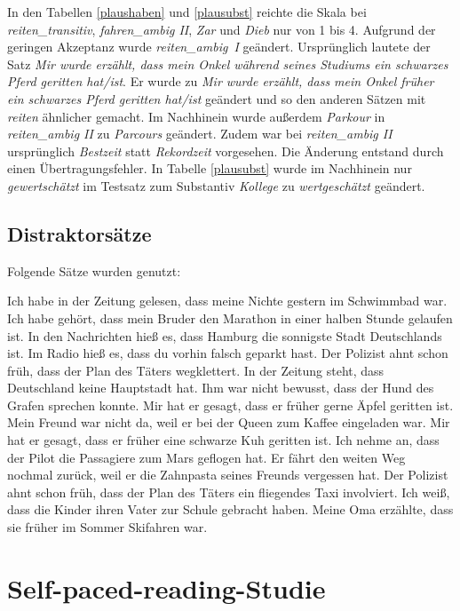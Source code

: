In den Tabellen \ref{plaushaben} und \ref{plausubst} reichte die Skala bei \textit{reiten\_transitiv}, \textit{fahren\_ambig II}, \textit{Zar} und \textit{Dieb} nur von 1 bis 4. Aufgrund der geringen Akzeptanz wurde \textit{\mbox{reiten\_}\mbox{ambig}~I} geändert. Ursprünglich lautete der Satz  \textit{Mir wurde erzählt, dass mein Onkel während seines Studiums ein schwarzes Pferd geritten hat/ist}. Er wurde zu \textit{Mir wurde erzählt, dass mein Onkel früher ein schwarzes Pferd geritten hat/ist} geändert und so den anderen Sätzen mit \textit{reiten} ähnlicher gemacht. Im Nachhinein wurde außerdem \textit{Parkour} in \textit{reiten\_ambig II} zu \textit{Parcours} geändert. Zudem war bei \textit{reiten\_ambig II} ursprünglich \textit{Bestzeit} statt \textit{Rekordzeit} vorgesehen. Die Änderung entstand durch einen Übertragungsfehler. In Tabelle \ref{plausubst} wurde im Nachhinein nur \textit{gewertschätzt} im Testsatz zum Substantiv \textit{Kollege} zu \textit{wertgeschätzt} geändert.


\section{Distraktorsätze}
\label{distraktoran}
Folgende Sätze wurden genutzt:

\ea Ich habe in der Zeitung gelesen, dass meine Nichte gestern im Schwimmbad war.
\ex Ich habe gehört, dass mein Bruder den Marathon in einer halben Stunde gelaufen ist.
\ex In den Nachrichten hieß es, dass Hamburg die sonnigste Stadt Deutschlands ist.
\ex Im Radio hieß es, dass du vorhin falsch geparkt hast.
\ex Der Polizist ahnt schon früh, dass der Plan des Täters wegklettert.
\ex In der Zeitung steht, dass Deutschland keine Hauptstadt hat.
\ex Ihm war nicht bewusst, dass der Hund des Grafen sprechen konnte.
\ex Mir hat er gesagt, dass er früher gerne Äpfel geritten ist.
\ex Mein Freund war nicht da, weil er bei der Queen zum Kaffee eingeladen war.
\ex Mir hat er gesagt, dass er früher eine schwarze Kuh geritten ist.
\ex Ich nehme an, dass der Pilot die Passagiere zum Mars geflogen hat.
\ex Er fährt den weiten Weg nochmal zurück, weil er die Zahnpasta seines Freunds vergessen hat.
\ex Der Polizist ahnt schon früh, dass der Plan des Täters ein fliegendes Taxi involviert.
\ex Ich weiß, dass die Kinder ihren Vater zur Schule gebracht haben.
\ex Meine Oma erzählte, dass sie früher im Sommer Skifahren war.
\z

\chapter{Self-paced-reading-Studie}
\label{ablaufpaced}
